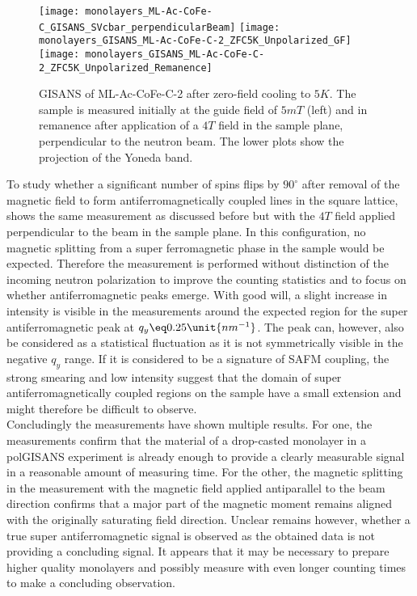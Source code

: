 \documentclass[\main/dresen_thesis.tex]{subfiles}
\begin{document}
  \begin{figure}[tb]
    \centering
    \texttt{[image: monolayers\_ML-Ac-CoFe-C\_GISANS\_SVcbar\_perpendicularBeam]}
    \texttt{[image: monolayers\_GISANS\_ML-Ac-CoFe-C-2\_ZFC5K\_Unpolarized\_GF]}
    \texttt{[image: monolayers\_GISANS\_ML-Ac-CoFe-C-2\_ZFC5K\_Unpolarized\_Remanence]}
    \caption{\label{fig:monolayer:magneticStructure:Gisans5KZFCperpendicular}GISANS of ML-Ac-CoFe-C-2 after zero-field cooling to $5 \unit{K}$. The sample is measured initially at the guide field of $5 \unit{mT}$ (left) and in remanence after application of a $4 \unit{T}$ field in the sample plane, perpendicular to the neutron beam. The lower plots show the projection of the Yoneda band.}
  \end{figure}

  To study whether a significant number of spins flips by $90 ^\circ$ after removal of the magnetic field to form antiferromagnetically coupled lines in the square lattice,  shows the same measurement as discussed before but with the $4 \unit{T}$ field applied perpendicular to the beam in the sample plane.
  In this configuration, no magnetic splitting from a super ferromagnetic phase in the sample would be expected.
  Therefore the measurement is performed without distinction of the incoming neutron polarization to improve the counting statistics and to focus on whether antiferromagnetic peaks emerge.
  With good will, a slight increase in intensity is visible in the measurements around the expected region for the super antiferromagnetic peak at $q_y \eq 0.25 \unit{nm^{-1}}$.
  The peak can, however, also be considered as a statistical fluctuation as it is not symmetrically visible in the negative $q_y$ range.
  If it is considered to be a signature of SAFM coupling, the strong smearing and low intensity suggest that the domain of super antiferromagnetically coupled regions on the sample have a small extension and might therefore be difficult to observe.
  \\

  Concludingly the measurements have shown multiple results.
  For one, the measurements confirm that the material of a drop-casted monolayer in a polGISANS experiment is already enough to provide a clearly measurable signal in a reasonable amount of measuring time.
  For the other, the magnetic splitting in the measurement with the magnetic field applied antiparallel to the beam direction confirms that a major part of the magnetic moment remains aligned with the originally saturating field direction.
  Unclear remains however, whether a true super antiferromagnetic signal is observed as the obtained data is not providing a concluding signal.
  It appears that it may be necessary to prepare higher quality monolayers and possibly measure with even longer counting times to make a concluding observation.

\end{document}
